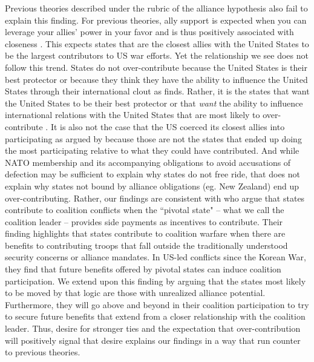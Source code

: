 \documentclass[12pt,letterpaper]{article}
\begin{document}
	Previous theories described under the rubric of the alliance hypothesis also fail to explain this finding. For previous theories, ally support is expected when you can leverage your allies' power in your favor and is thus positively associated with closeness \citep{davidson_neoclassicalrealistexplanation_2011}. This expects states that are the closest allies with the United States to be the largest contributors to US war efforts. Yet the relationship we see does not follow this trend. States do not over-contribute because the United States is their best protector or because they think they have the ability to influence the United States through their international clout as \citet{ringsmose_natoburdensharingredux_2010} finds. Rather, it is the states that want the United States to be their best protector or that \textit{want} the ability to influence international relations with the United States that are most likely to over-contribute \citep{vonhlatky_greatasymmetryamerica_2010}. It is also not the case that the US coerced its closest allies into participating as argued by \citet{kupchan_natopersiangulf_1988} because those are not the states that ended up doing the most participating relative to what they could have contributed. And while NATO membership and its accompanying obligations to avoid accusations of defection may be sufficient to explain why states do not free ride, that does not explain why states not bound by alliance obligations (eg. New Zealand) end up over-contributing. Rather, our findings are consistent with \citet{henke_buyingalliespayment_2019} who argue that states contribute to coalition conflicts when the ``pivotal state" -- what we call the coalition leader -- provides side payments as incentives to contribute. Their finding highlights that states contribute to coalition warfare when there are benefits to contributing troops that fall outside the traditionally understood security concerns or alliance mandates. In US-led conflicts since the Korean War, they find that future benefits offered by pivotal states can induce coalition participation. We extend upon this finding by arguing that the states most likely to be moved by that logic are those with unrealized alliance potential. Furthermore, they will go above and beyond in their coalition participation to try to secure future benefits that extend from a closer relationship with the coalition leader. Thus, desire for stronger ties and the expectation that over-contribution will positively signal that desire explains our findings in a way that run counter to previous theories.
\end{document}
